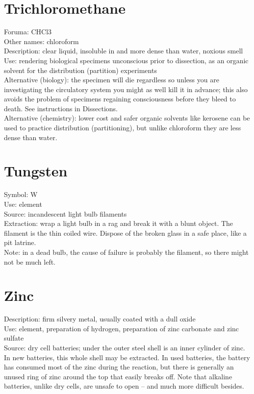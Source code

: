 \section{Trichloromethane}
Foruma: CHCl3\\
Other names: chloroform\\
Description: clear liquid, 
insoluble in and more dense than water, 
noxious smell\\
Use: rendering biological specimens unconscious prior to dissection, 
as an organic solvent for the distribution (partition) experiments\\
Alternative (biology): the specimen will die regardless 
so unless you are investigating the circulatory system 
you might as well kill it in advance; 
this also avoids the problem of specimens regaining consciousness 
before they bleed to death. 
See instructions in Dissections.\\
Alternative (chemistry): lower cost and safer organic solvents like kerosene can be used to practice distribution (partitioning), 
but unlike chloroform they are less dense than water.

\section{Tungsten}
Symbol: W\\
Use: element\\
Source: incandescent light bulb filaments\\
Extraction: wrap a light bulb in a rag and break it with a blunt object. 
The filament is the thin coiled wire. 
Dispose of the broken glass in a safe place, 
like a pit latrine.\\
Note: in a dead bulb, the cause of failure is probably the filament, 
so there might not be much left.

\section{Zinc}
Description: firm silvery metal, 
usually coated with a dull oxide\\
Use: element, 
preparation of hydrogen, 
preparation of zinc carbonate and zinc sulfate\\
Source: dry cell batteries; 
under the outer steel shell is an inner cylinder of zinc. 
In new batteries, 
this whole shell may be extracted. 
In used batteries, 
the battery has consumed most of the zinc during the reaction, 
but there is generally an unused ring of zinc around the top 
that easily breaks off. 
Note that alkaline batteries, 
unlike dry cells, 
are unsafe to open – and much more difficult besides.

